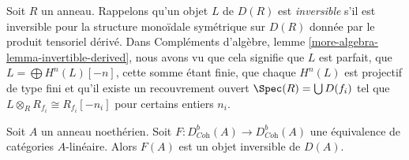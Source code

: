 \noindent
Soit $R$ un anneau. Rappelons qu'un objet $L$ de $D(R)$
est {\it inversible} s'il est inversible pour la structure
monoïdale symétrique sur $D(R)$ donnée par le produit tensoriel dérivé.
Dans Compléments d'algèbre, lemme \ref{more-algebra-lemma-invertible-derived}, nous avons vu que cela signifie
que $L$ est parfait, que $L = \bigoplus H^n(L)[-n]$, cette somme étant finie,
que chaque $H^n(L)$ est projectif de type fini
et qu'il existe un recouvrement ouvert $\Spec(R) = \bigcup D(f_i)$ tel que
$L \otimes_R R_{f_i} \cong R_{f_i}[-n_i]$ pour certains entiers $n_i$.

\begin{lemma}
\label{lemma-equivalence-comes-from-invertible}
Soit $A$ un anneau noethérien. Soit $F : D^b_{\textit{Coh}}(A) \to D^b_{\textit{Coh}}(A)$
une équivalence de catégories $A$-linéaire.
Alors $F(A)$ est un objet inversible de $D(A)$.
\end{lemma}


